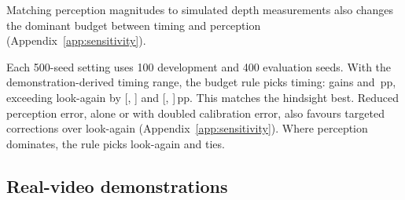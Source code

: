 \documentclass{article}
\newcommand{\pp}{\,pp}
\begin{document}
Matching perception magnitudes to simulated depth measurements also changes the dominant budget between timing and perception (Appendix~\ref{app:sensitivity}).

Each 500-seed setting uses 100 development and 400 evaluation seeds.
With the demonstration-derived timing range, the budget rule picks timing: gains \tmRuleA{} and \tmRuleB\pp{}, exceeding look-again by \tmDiffA{} [\tmDiffLoA, \tmDiffHiA] and \tmDiffB{} [\tmDiffLoB, \tmDiffHiB]\pp{}.
This matches the hindsight best. Reduced perception error, alone or with doubled calibration error, also favours targeted corrections over look-again (Appendix~\ref{app:sensitivity}). Where perception dominates, the rule picks look-again and ties.

\subsection{Real-video demonstrations}
\end{document}
